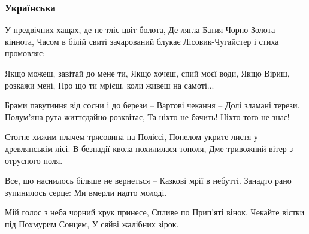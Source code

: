 
 

\subsubsection{Українська}

У предвічних хащах, де не тліє цвіт болота,
Де лягла Батия Чорно-Золота кіннота,
Часом в білій свиті зачарований блукає
Лісовик-Чугайстер і стиха промовляє:

Якщо можеш, завітай до мене ти,
Якщо хочеш, спий моєї води,
Якщо Віриш, розкажи мені,
Про що ти мрієш, коли живеш на самоті...

Брами павутиння від сосни і до берези –
Вартові чекання – Долі зламані терези.
Полум’яна рута життєдайно розквітає,
Та ніхто не бачить! Ніхто того не знає!

Стогне хижим плачем трясовина на Поліссі,
Попелом укрите листя у древлянськім лісі.
В безнадії квола похилилася тополя,
Дме тривожний вітер з отруєного поля.

Все, що наснилось більше не вернеться –
Казкові мрії в небутті.
Занадто рано зупинилось серце:
Ми вмерли надто молоді.

Мій голос з неба чорний крук принесе,
Спливе по Прип’яті вінок.
Чекайте вістки під Похмурим Сонцем,
У сяйві жалібних зірок.
